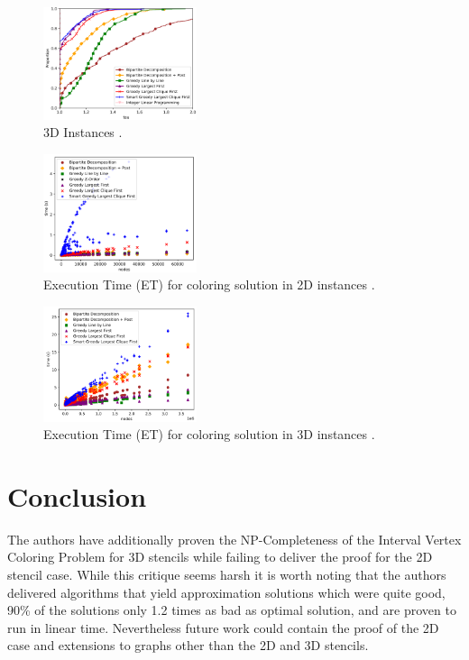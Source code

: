 \documentclass[sigconf]{acmart}
\begin{document}
\begin{figure}[h]
  \centering
  \includegraphics[width=0.4\textwidth]{figures/3d_results_ilp.png}
  \caption{3D Instances \cite{main_paper}.}
  \label{3d_results_ilp}
\end{figure}

\begin{figure}[h] 
  \centering
  \includegraphics[width=0.4\textwidth]{figures/time_results_2D.png}
  \caption{Execution Time (ET) for coloring solution in 2D instances \cite{main_paper}.}
  \label{ET_2D}
\end{figure}

\begin{figure}[h]
  \centering
  \includegraphics[width=0.4\textwidth]{figures/time_results_3D.png}
  \caption{Execution Time (ET) for coloring solution in 3D instances \cite{main_paper}.}
  \label{ET_3D}
\end{figure}

\section{Conclusion}
The authors have additionally proven the NP-Completeness of the Interval Vertex Coloring Problem for 3D stencils while
failing to deliver the proof for the 2D stencil case. While this critique seems harsh it is worth noting that 
the authors delivered algorithms that yield approximation solutions which were quite good, 90\% of the solutions only 1.2 times as bad as optimal solution, and are proven to run in linear time.
Nevertheless future work could contain the proof of the 2D case and extensions to graphs other than the 2D and 3D stencils.



\end{document}

